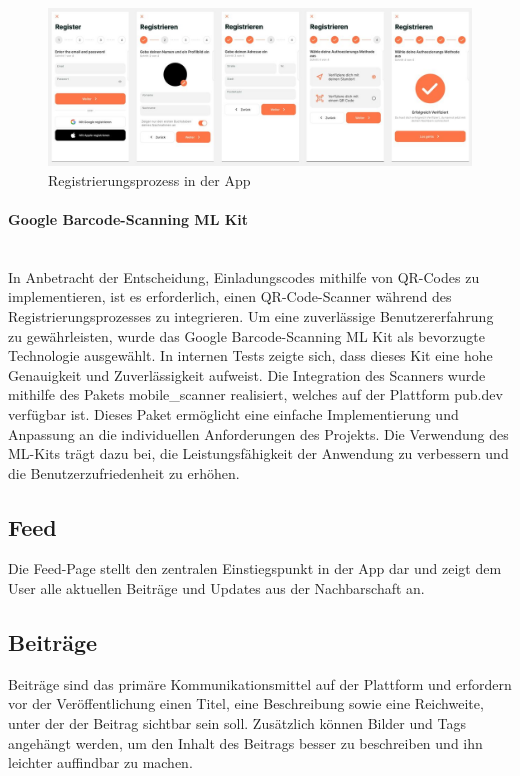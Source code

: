 \begin{figure}[H]
  \centering
  \includegraphics[width=\textwidth]{pics/registration-process.JPG}
  \caption{Registrierungsprozess in der App}
  \label{fig:registration-process}
\end{figure}

\paragraph{Google Barcode-Scanning ML Kit}\mbox{} \\
In Anbetracht der Entscheidung, Einladungscodes mithilfe von QR-Codes zu implementieren, ist es erforderlich, einen QR-Code-Scanner während des Registrierungsprozesses zu integrieren. Um eine zuverlässige Benutzererfahrung zu gewährleisten, wurde das Google Barcode-Scanning ML Kit als bevorzugte Technologie ausgewählt. In internen Tests zeigte sich, dass dieses Kit eine hohe Genauigkeit und Zuverlässigkeit aufweist.
Die Integration des Scanners wurde mithilfe des Pakets \cite{mobile_scanner} mobile\_scanner realisiert, welches auf der Plattform pub.dev verfügbar ist. Dieses Paket ermöglicht eine einfache Implementierung und Anpassung an die individuellen Anforderungen des Projekts. Die Verwendung des ML-Kits trägt dazu bei, die Leistungsfähigkeit der Anwendung zu verbessern und die Benutzerzufriedenheit zu erhöhen.


\subsection{Feed}
Die Feed-Page stellt den zentralen Einstiegspunkt in der App dar und zeigt dem User alle aktuellen Beiträge und Updates aus der Nachbarschaft an.

\subsection{Beiträge}
Beiträge sind das primäre Kommunikationsmittel auf der Plattform und erfordern vor der Veröffentlichung einen Titel, eine Beschreibung sowie eine Reichweite, unter der der Beitrag sichtbar sein soll. Zusätzlich können Bilder und Tags angehängt werden, um den Inhalt des Beitrags besser zu beschreiben und ihn leichter auffindbar zu machen.


